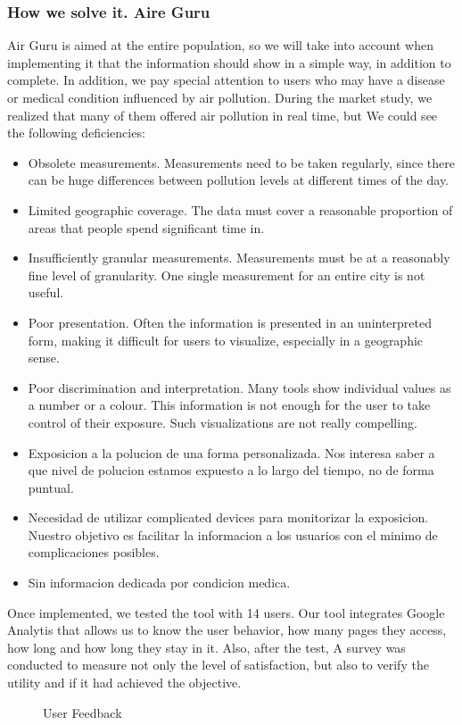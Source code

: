 \subsubsection{How we solve it. Aire Guru} 
Air Guru is aimed at the entire population, so we will take into account when implementing it that the information should
show in a simple way, in addition to complete. In addition, we pay special attention to users who may have a
disease or medical condition influenced by air pollution.
During the market study, we realized that many of them offered air pollution in real time, but
We could see the following deficiencies:
\begin{itemize}
    \item Obsolete measurements. Measurements need to be taken regularly, since there can be huge differences
    between pollution levels at different times of the day.
    \item Limited geographic coverage. The data must cover a reasonable proportion of areas that people spend significant time in.
    \item Insufficiently granular measurements. Measurements must be at a reasonably fine level of granularity. One single measurement for an entire city is not useful.
    \item Poor presentation. Often the information is presented in an uninterpreted form, making it difficult for users to visualize, especially in a geographic sense.
    \item Poor discrimination and interpretation. Many tools show individual values as a number or a colour. This information is not
    enough for the user to take control of their exposure. Such visualizations are not really compelling. 
    \item Exposicion a la polucion de una forma personalizada. Nos interesa saber a que nivel de polucion estamos expuesto
    a lo largo del tiempo, no de forma puntual.
    \item Necesidad de utilizar complicated devices para monitorizar la exposicion. Nuestro objetivo es facilitar la informacion a los 
    usuarios con el minimo de complicaciones posibles.
    \item Sin informacion dedicada por condicion medica.
\end{itemize}

Once implemented, we tested the tool with 14 users. Our tool integrates Google Analytis that allows us to know the
user behavior, how many pages they access, how long and how long they stay in it. Also, after the test,
A survey was conducted to measure not only the level of satisfaction, but also to verify the utility and if it had achieved the objective.
\begin{figure}[ht]
    \centering
    \hfill
  
  \caption{User Feedback}
    \end{figure}
 
